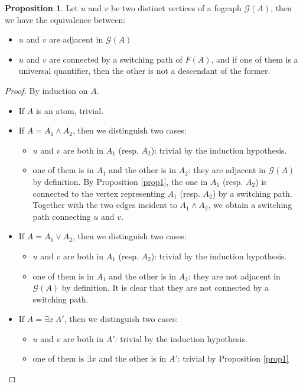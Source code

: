 \documentclass[conference]{IEEEtran}
\theoremstyle{definition}
\newtheorem{proposition}[thm]{Proposition}
\newcommand{\Gr}{\mathcal{G}}
\begin{document}
\begin{proposition}
\label{prop2}
Let $u$ and $v$ be two distinct vertices of a fograph $\Gr(A)$, then we have the equivalence
between:
\begin{itemize}
  \item $u$ and $v$ are adjacent in $\Gr(A)$
  \item $u$ and $v$ are connected by a switching path of $F(A)$, and if one of them is a universal quantifier, then the other is
	not a descendant of the former.
  \end{itemize}
\begin{proof}
By induction on $A$.
\begin{itemize}
  \item If $A$ is an atom, trivial.
  \item If $A = A_1 \wedge A_2$, then we distinguish two cases:
    \begin{itemize}
      \item $u$ and $v$ are both in $A_1$ (resp. $A_2$): trivial by
	      the induction hypothesis.
      \item one of them is in $A_1$ and the other is in $A_2$: they are
	      adjacent in $\Gr(A)$ by definition. By Proposition \ref{prop1},
		    the one in $A_1$ (resp. $A_2$) is connected to the
		    vertex representing $A_1$ (resp. $A_2$) by a switching
		    path. Together with the two edges incident to $A_1 \wedge
		    A_2$, we obtain a switching path connecting $u$ and $v$.
    \end{itemize}
  \item If $A = A_1 \vee A_2$, then we distinguish two cases:
    \begin{itemize}
      \item $u$ and $v$ are both in $A_1$ (resp. $A_2$): trivial by
	      the induction hypothesis.
      \item one of them is in $A_1$ and the other is in $A_2$: they are not
	      adjacent in $\Gr(A)$ by definition. It is clear that they
		    are not connected by a switching path.
    \end{itemize}
  \item If $A = \exists x \ A'$, then we distinguish two cases:
    \begin{itemize}
      \item $u$ and $v$ are both in $A'$: trivial by the induction
	      hypothesis.
      \item one of them is $\exists x$ and the other is in $A'$: trivial
	      by Proposition \ref{prop1}


\end{itemize}
\end{itemize}
\end{proof}
\end{proposition}
\end{document}
